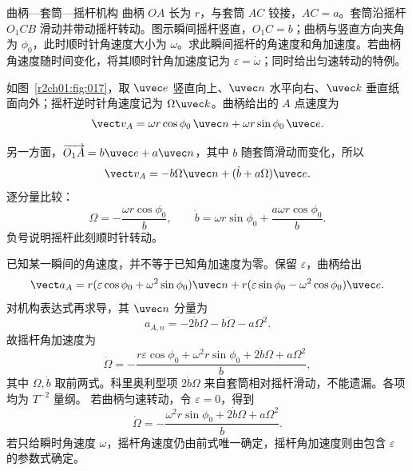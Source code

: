 \begin{practicebox}{曲柄—套筒—摇杆机构}
曲柄 $OA$ 长为 $r$，与套筒 $AC$ 铰接，$AC=a$。套筒沿摇杆 $O_1CB$ 滑动并带动摇杆转动。图示瞬间摇杆竖直，$O_1C=b$；曲柄与竖直方向夹角为 $\phi_0$，此时顺时针角速度大小为 $\omega$。求此瞬间摇杆的角速度和角加速度。若曲柄角速度随时间变化，将其顺时针角加速度记为 $\varepsilon=\dot\omega$；同时给出匀速转动的特例。
\label{r2ch01:pr:014}
\begin{solution}
如图~\ref{r2ch01:fig:017}，取 $\uvec e$ 竖直向上、$\uvec n$ 水平向右、$\uvec k$ 垂直纸面向外；摇杆逆时针角速度记为 $\Omega\uvec k$。曲柄给出的 $A$ 点速度为
\[
  \vect v_A=\omega r\cos\phi_0\,\uvec n
  +\omega r\sin\phi_0\,\uvec e.
\]

\figRocker

另一方面，$\overrightarrow{O_1A}=b\uvec e+a\uvec n$，其中 $b$ 随套筒滑动而变化，所以
\[
  \vect v_A=-b\Omega\uvec n+(\dot b+a\Omega)\uvec e.
\]
逐分量比较：
\[
  \boxed{\Omega=-\frac{\omega r\cos\phi_0}{b}},\qquad
  \dot b=\omega r\sin\phi_0+\frac{a\omega r\cos\phi_0}{b}.
\]
负号说明摇杆此刻顺时针转动。

已知某一瞬间的角速度，并不等于已知角加速度为零。保留 $\varepsilon$，曲柄给出
\[
  \vect a_A=r(\varepsilon\cos\phi_0+\omega^2\sin\phi_0)\uvec n
  +r(\varepsilon\sin\phi_0-\omega^2\cos\phi_0)\uvec e.
\]
对机构表达式再求导，其 $\uvec n$ 分量为
\[
  a_{A,n}=-2\dot b\Omega-b\dot\Omega-a\Omega^2.
\]
故摇杆角加速度为
\[
  \boxed{\dot\Omega=-\frac{r\varepsilon\cos\phi_0+\omega^2r\sin\phi_0+2\dot b\Omega+a\Omega^2}{b}},
\]
其中 $\Omega,\dot b$ 取前两式。科里奥利型项 $2\dot b\Omega$ 来自套筒相对摇杆滑动，不能遗漏。各项均为 $T^{-2}$ 量纲。
若曲柄匀速转动，令 $\varepsilon=0$，得到
\[
 \dot\Omega=-\frac{\omega^2r\sin\phi_0+2\dot b\Omega+a\Omega^2}{b}.
\]
若只给瞬时角速度 $\omega$，摇杆角速度仍由前式唯一确定，摇杆角加速度则由包含 $\varepsilon$ 的参数式确定。
\end{solution}
\end{practicebox}

